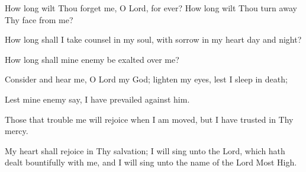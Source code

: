 How long wilt Thou forget me, O Lord, for ever? How long wilt Thou turn away Thy face from me?

How long shall I take counsel in my soul, with sorrow in my heart day and night?

How long shall mine enemy be exalted over me?

Consider and hear me, O Lord my God; lighten my eyes, lest I sleep in death;

Lest mine enemy say, I have prevailed against him.

Those that trouble me will rejoice when I am moved, but I have trusted in Thy mercy.

My heart shall rejoice in Thy salvation; I will sing unto the Lord, which hath dealt bountifully with me, and I will sing unto the name of the Lord Most High.
